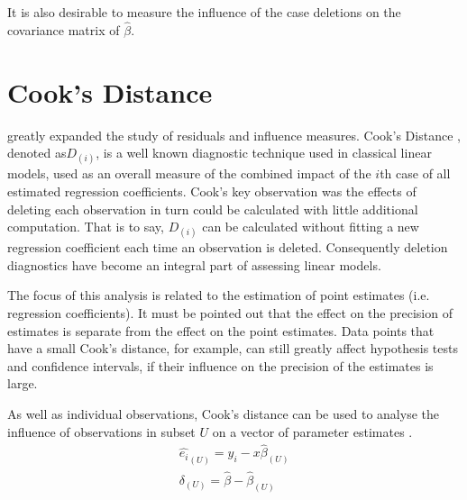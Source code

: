 \documentclass[12pt, a4paper]{article}
\begin{document}
It is also desirable to measure the influence of the case deletions on the covariance matrix of $\hat{\beta}$.

\section{Cook's Distance} %
%
\citet{cook77} greatly expanded the study of residuals and influence measures. Cook's Distance , denoted as$D_{(i)}$, is a well known diagnostic technique used in classical linear models, used as an overall measure of the combined impact of the $i$th case of all estimated regression coefficients. Cook's key observation was the effects of deleting each observation in turn could be calculated with little additional computation. That is to say, $D_{(i)}$ can be calculated without fitting a new regression coefficient each time an observation is deleted.  Consequently deletion diagnostics have become an integral part of assessing linear models. 

The focus of this analysis is related to the estimation of point estimates (i.e. regression coefficients). It must be pointed out that the effect on the precision of estimates is separate from the effect on the point estimates. Data points that
have a small Cook's distance, for example, can still greatly affect hypothesis tests and confidence intervals, if their  influence on the precision of the estimates is large.

As well as individual observations, Cook's distance can be used to analyse the influence of observations in subset $U$ on a vector of parameter estimates \citep{cook77}.
\begin{eqnarray}
\hat{e_{i}}_{(U)} = y_{i} - x\hat{\beta}_{(U)}\\
\delta_{(U)} = \hat{\beta} - \hat{\beta}_{(U)}
\end{eqnarray}
\end{document}

